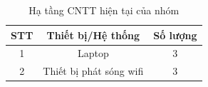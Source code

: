 \begin{table}[htpb]
    \centering
    \caption{Hạ tầng CNTT hiện tại của nhóm}
    \label{tab:hien_trang_he_thong}
    \renewcommand{\arraystretch}{1.5} %
    \begin{tabular}{|c|c|c|}
        \hline
        \textbf{STT} & 
        \centering\textbf{Thiết bị/Hệ thống} & 
        \textbf{Số lượng}  
        
             \\ \hline
        
        1 & Laptop & 3  \\ \hline
        2 & Thiết bị phát sóng wifi  & 3  \\ \hline
        
    \end{tabular}
\end{table}